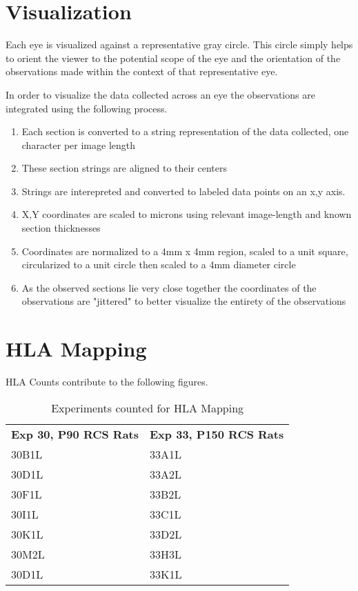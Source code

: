 \documentclass{article}
\begin{document}
\section{Visualization}
Each eye is visualized against a representative gray circle. This circle simply helps to orient the viewer to the potential scope of the eye and the orientation of the observations made within the context of that representative eye.

In order to visualize the data collected across an eye the observations are integrated using the following process. 

\begin{enumerate}
\item Each section is converted to a string representation of the data collected, one character per image length
\item These section strings are aligned to their centers
\item Strings are interepreted and converted to labeled data points on an x,y axis. 
\item X,Y coordinates are scaled to microns using relevant image-length and known section thicknesses
\item Coordinates are normalized to a 4mm x 4mm region, scaled to a unit square, circularized to a unit circle then scaled to a 4mm diameter circle
\item As the observed sections lie very close together the coordinates of the observations are "jittered" to better visualize the entirety of the observations
\end{enumerate}


\section{HLA Mapping}
HLA Counts contribute to the following figures. 
\begin{table}[]
\centering
\begin{tabular}{ll}
 \textbf{Exp 30, P90 RCS Rats} & \textbf{Exp 33, P150 RCS Rats} \\
30B1L & 33A1L \\
30D1L & 33A2L \\
30F1L & 33B2L \\
30I1L & 33C1L \\
30K1L & 33D2L \\
30M2L & 33H3L \\
30D1L & 33K1L \\
\end{tabular}
\caption{Experiments counted for HLA Mapping}
\end{table}
\end{document}
